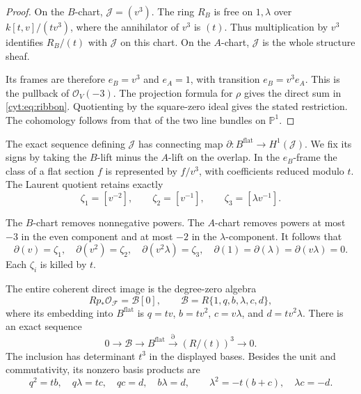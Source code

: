 \begin{proof}
On the \(B\)-chart, \(\mathcal J=(v^3)\).
The ring \(R_B\) is free on \(1,\lambda\) over
\(k[t,v]/(tv^3)\), where the annihilator of \(v^3\) is
\((t)\). Thus multiplication by \(v^3\) identifies
\(R_B/(t)\) with \(\mathcal J\) on this chart.
On the \(A\)-chart, \(\mathcal J\) is the whole structure
sheaf.

Its frames are therefore \(e_B=v^3\) and \(e_A=1\),
with transition \(e_B=v^3e_A\). This is the pullback of
\(\mathcal O_V(-3)\). The projection formula for \(\rho\)
gives the direct sum in \eqref{cyt:eq:ribbon}.
Quotienting by the square-zero ideal gives the stated restriction.
The cohomology follows from that of the two line bundles on
\(\mathbb P^1\).
\end{proof}

The exact sequence defining \(\mathcal J\) has connecting map
\(\partial:B^{\mathrm{flat}}\to H^1(\mathcal J)\).
We fix its signs by taking the \(B\)-lift minus the \(A\)-lift
on the overlap. In the \(e_B\)-frame the class of a flat
section \(f\) is represented by \(f/v^3\), with coefficients
reduced modulo \(t\). The Laurent quotient retains exactly
\[
 \zeta_1=[v^{-2}],\qquad \zeta_2=[v^{-1}],\qquad
\zeta_3=[\lambda v^{-1}].
\]

The \(B\)-chart removes nonnegative powers. The \(A\)-chart
removes powers at most \(-3\) in the even component and
at most \(-2\) in the \(\lambda\)-component. It follows that
\begin{equation}\label{cyt:eq:boundary}
 \partial(v)=\zeta_1,\quad \partial(v^2)=\zeta_2,\quad
 \partial(v^2\lambda)=\zeta_3,\quad
 \partial(1)=\partial(\lambda)=\partial(v\lambda)=0.
\end{equation}
Each \(\zeta_i\) is killed by \(t\).

\begin{theorem}\label{cyt:thm:coherent}
The entire coherent direct image is the degree-zero algebra
\begin{equation}\label{cyt:eq:algebra}
 Rp_*\mathcal O_{\mathscr F}=\mathcal B[0],\qquad
 \mathcal B=R\{1,q,b,\lambda,c,d\},
\end{equation}
where its embedding into \(B^{\mathrm{flat}}\) is
\(q=tv\), \(b=tv^2\), \(c=v\lambda\), and
\(d=tv^2\lambda\). There is an exact sequence
\begin{equation}\label{cyt:eq:index}
 0\longrightarrow\mathcal B\longrightarrow B^{\mathrm{flat}}
 \xrightarrow{\partial}(R/(t))^3\longrightarrow0.
\end{equation}
The inclusion has determinant \(t^3\) in the displayed bases.
Besides the unit and commutativity, its nonzero basis products are
\begin{equation}\label{cyt:eq:products}
 q^2=tb,\quad q\lambda=tc,\quad qc=d,\quad b\lambda=d,
 \qquad \lambda^2=-t(b+c),\quad \lambda c=-d.
\end{equation}
\end{theorem}

